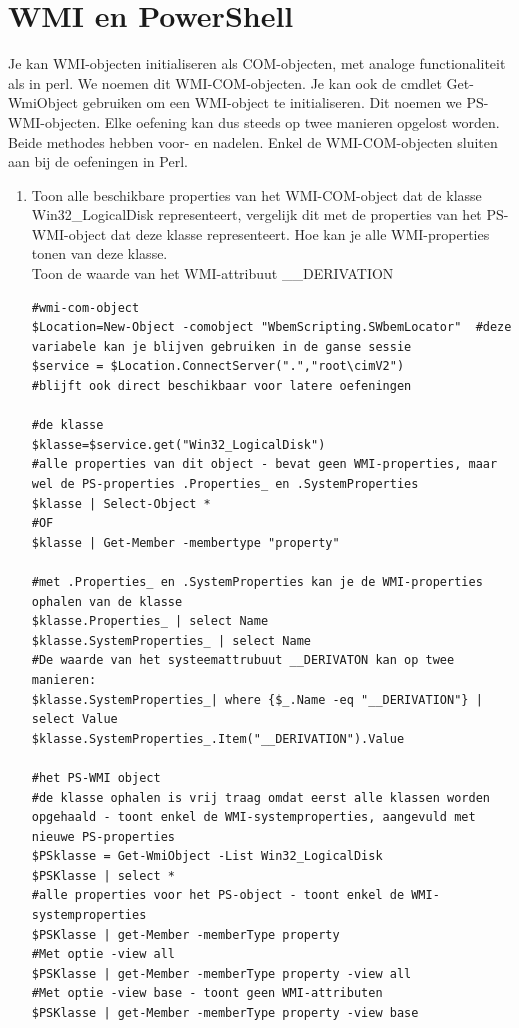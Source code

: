 \documentclass[11pt,a4paper]{report}
\begin{document}
\section{WMI en PowerShell}

Je kan WMI-objecten initialiseren als COM-objecten, met analoge functionaliteit als in perl. We noemen dit WMI-COM-objecten. Je kan ook de cmdlet Get-WmiObject gebruiken om een WMI-object te initialiseren. Dit noemen we PS-WMI-objecten. Elke oefening kan dus steeds op twee manieren opgelost worden. Beide methodes hebben voor- en nadelen. Enkel de WMI-COM-objecten sluiten aan bij de oefeningen in Perl.
\begin{enumerate}[resume]
	\item Toon alle beschikbare properties van het WMI-COM-object dat de klasse Win32\_LogicalDisk representeert, vergelijk dit met de properties van het PS-WMI-object dat deze klasse representeert.
	Hoe kan je alle WMI-properties tonen van deze klasse.
	\\Toon de waarde van het WMI-attribuut \_\_DERIVATION
	\begin{lstlisting}
#wmi-com-object
$Location=New-Object -comobject "WbemScripting.SWbemLocator"  #deze variabele kan je blijven gebruiken in de ganse sessie
$service = $Location.ConnectServer(".","root\cimV2")          #blijft ook direct beschikbaar voor latere oefeningen

#de klasse 
$klasse=$service.get("Win32_LogicalDisk")
#alle properties van dit object - bevat geen WMI-properties, maar wel de PS-properties .Properties_ en .SystemProperties
$klasse | Select-Object *
#OF
$klasse | Get-Member -membertype "property"

#met .Properties_ en .SystemProperties kan je de WMI-properties ophalen van de klasse
$klasse.Properties_ | select Name
$klasse.SystemProperties_ | select Name
#De waarde van het systeemattrubuut __DERIVATON kan op twee manieren:
$klasse.SystemProperties_| where {$_.Name -eq "__DERIVATION"} | select Value
$klasse.SystemProperties_.Item("__DERIVATION").Value

#het PS-WMI object
#de klasse ophalen is vrij traag omdat eerst alle klassen worden opgehaald - toont enkel de WMI-systemproperties, aangevuld met nieuwe PS-properties
$PSklasse = Get-WmiObject -List Win32_LogicalDisk 
$PSKlasse | select *
#alle properties voor het PS-object - toont enkel de WMI-systemproperties
$PSKlasse | get-Member -memberType property
#Met optie -view all
$PSKlasse | get-Member -memberType property -view all
#Met optie -view base - toont geen WMI-attributen
$PSKlasse | get-Member -memberType property -view base


\end{lstlisting}
\end{enumerate}
\end{document}
